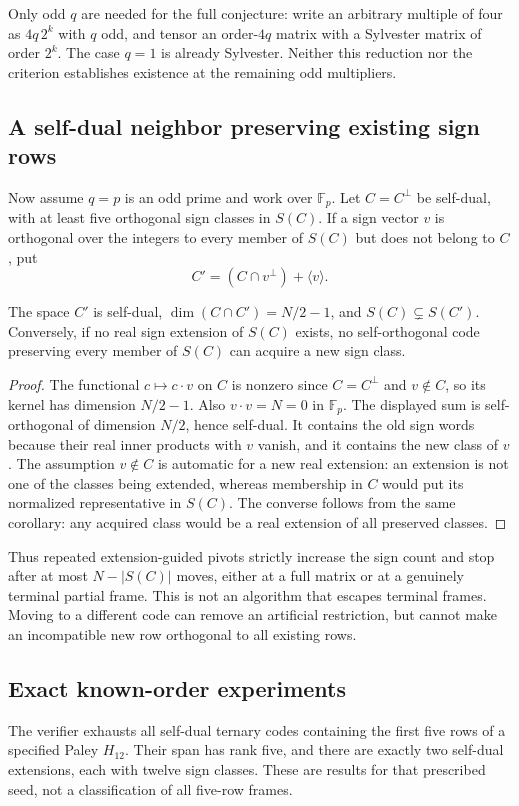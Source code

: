 Only odd $q$ are needed for the full conjecture: write an arbitrary
multiple of four as $4q\,2^k$ with $q$ odd, and tensor an order-$4q$
matrix with a Sylvester matrix of order $2^k$. The case $q=1$
is already Sylvester. Neither this reduction nor the criterion
establishes existence at the remaining odd multipliers.

\subsection{A self-dual neighbor preserving existing sign rows}
Now assume $q=p$ is an odd prime and work over $\mathbb F_p$.
Let $C=C^\perp$ be self-dual, with at least five orthogonal sign
classes in $S(C)$. If a sign vector $v$ is orthogonal over the
integers to every member of $S(C)$ but does not belong to $C$, put
\[
 C'=(C\cap v^\perp)+\langle v\rangle.
\]
\begin{proposition}\label{code:pivot}
The space $C'$ is self-dual, $\dim(C\cap C')=N/2-1$, and
$S(C)\subsetneq S(C')$. Conversely, if no real sign extension of
$S(C)$ exists, no self-orthogonal code preserving every member
of $S(C)$ can acquire a new sign class.
\end{proposition}
\begin{proof}
The functional $c\mapsto c\cdot v$ on $C$ is nonzero since
$C=C^\perp$ and $v\notin C$, so its kernel has dimension $N/2-1$.
Also $v\cdot v=N=0$ in $\mathbb F_p$. The displayed sum is
self-orthogonal of dimension $N/2$, hence self-dual.
It contains the old sign words because their real inner products
with $v$ vanish, and it contains the new class of $v$.
The assumption $v\notin C$ is automatic for a new real extension:
an extension is not one of the classes being extended, whereas
membership in $C$ would put its normalized representative in $S(C)$.
The converse follows from the same corollary: any acquired class
would be a real extension of all preserved classes.
\end{proof}

Thus repeated extension-guided pivots strictly increase the sign
count and stop after at most $N-|S(C)|$ moves, either at a full matrix
or at a genuinely terminal partial frame. This is not an algorithm
that escapes terminal frames. Moving to a different code can remove
an artificial restriction, but cannot make an incompatible new row
orthogonal to all existing rows.

\subsection{Exact known-order experiments}
The verifier exhausts all self-dual ternary codes containing the
first five rows of a specified Paley $H_{12}$. Their span has rank
five, and there are exactly two self-dual extensions, each with
twelve sign classes. These are results for that prescribed seed,
not a classification of all five-row frames.

